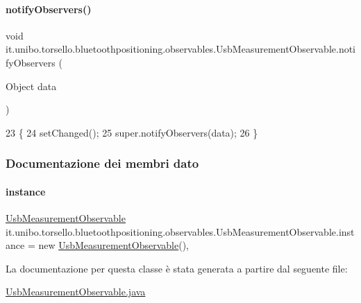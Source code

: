 \paragraph{\texorpdfstring{notify\+Observers()}{notifyObservers()}}
{\footnotesize\ttfamily void it.\+unibo.\+torsello.\+bluetoothpositioning.\+observables.\+Usb\+Measurement\+Observable.\+notify\+Observers (\begin{DoxyParamCaption}\item[{Object}]{data }\end{DoxyParamCaption})}


\begin{DoxyCode}
23                                              \{
24         setChanged();
25         super.notifyObservers(data);
26     \}
\end{DoxyCode}


\subsubsection{Documentazione dei membri dato}
\hypertarget{classit_1_1unibo_1_1torsello_1_1bluetoothpositioning_1_1observables_1_1UsbMeasurementObservable_a19cb655efdf8656403f342caca294e62_a19cb655efdf8656403f342caca294e62}{}\label{classit_1_1unibo_1_1torsello_1_1bluetoothpositioning_1_1observables_1_1UsbMeasurementObservable_a19cb655efdf8656403f342caca294e62_a19cb655efdf8656403f342caca294e62} 
\paragraph{\texorpdfstring{instance}{instance}}
{\footnotesize\ttfamily \hyperlink{classit_1_1unibo_1_1torsello_1_1bluetoothpositioning_1_1observables_1_1UsbMeasurementObservable}{Usb\+Measurement\+Observable} it.\+unibo.\+torsello.\+bluetoothpositioning.\+observables.\+Usb\+Measurement\+Observable.\+instance = new \hyperlink{classit_1_1unibo_1_1torsello_1_1bluetoothpositioning_1_1observables_1_1UsbMeasurementObservable}{Usb\+Measurement\+Observable}()\hspace{0.3cm}{\ttfamily [static]}, {\ttfamily [private]}}



La documentazione per questa classe è stata generata a partire dal seguente file\+:\begin{DoxyCompactItemize}
\item 
\hyperlink{UsbMeasurementObservable_8java}{Usb\+Measurement\+Observable.\+java}\end{DoxyCompactItemize}

